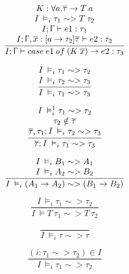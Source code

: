 \documentclass{article}
\begin{document}
\[
  \frac{\begin{array}{@{}c@{}}
   K : \forall a. \overline{\tau} \rightarrow T\:a\\
   I \: \vDash_{i} \tau_{1} \sim > T\:\tau_{2} \\
   I; \Upgamma \vdash e1 : \tau_{1} \\
   I; \Upgamma, \overline{x}: [a\rightarrow\tau_{2}]\overline{\tau} \vdash e2 : \tau_{2} \\
   \end{array}}
  {I; \Upgamma \vdash case \: e1 \: of \: (K  \: \overline{x}) \rightarrow e2 : \tau_{3}}
\]

\[
  \frac{\begin{array}{@{}c@{}}
   I \: \vDash_{i} \tau_{1} \sim > \tau_{2} \\
   I \: \vDash_{i} \tau_{2} \sim > \tau_{3}
  \end{array}}
  {I \: \vDash_{i} \tau_{1} \sim > \tau_{3}}
\]

\[
  \frac{\begin{array}{@{}c@{}}
    I \: \vDash_{i}^{1} \tau_{1} \sim > \tau_{2} \\
    \tau_{2} \notin \overline{\tau} \\
   \overline{\tau},\tau_{1};I \: \vDash_{i} \tau_{2} \sim > \tau_{3}
  \end{array}}
  {\overline{\tau};I \: \vDash_{i} \tau_{1} \sim > \tau_{3}}
\]

\[
  \frac{\begin{array}{@{}c@{}}
   I \:\vDash_{i} B_{1} \sim > A_{1} \\
   I \:\vDash_{i} A_{2} \sim > B_{2} \\
  \end{array}}
  {   I\:\vDash_{i} (A_{1} \rightarrow A_{2}) \sim > (B_{1} \rightarrow B_{2}) \\
}
\]

\[
  \frac{I \: \vDash_{i} \tau_{1} \sim > \tau_{2}}{I \: \vDash T \: \tau_{1} \sim >  T \: \tau_{2}}
\]

\[
\frac{}{ I\:\vDash_{i} \tau \sim > \tau}
\]

\[
\frac{(i: \tau_{1} \sim > \tau_{2})\in I}{ I\:\vDash_{i} \tau_{1} \sim > \tau_{2}}
\]


\\
\\
\\
\\
\\
\\
\\
\\
\end{document}
